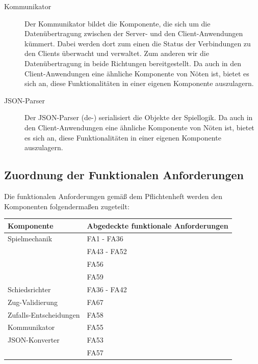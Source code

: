 \begin{description}
        \item[Kommunikator]
        Der Kommunikator bildet die Komponente, die sich um die Datenübertragung zwischen der Server- und den Client-Anwendungen kümmert. Dabei werden dort zum einen die Status der Verbindungen zu den Clients überwacht und verwaltet. Zum anderen wir die Datenübertragung in beide Richtungen bereitgestellt. Da auch in den Client-Anwendungen eine ähnliche Komponente von Nöten ist, bietet es sich an, diese Funktionalitäten in einer eigenen Komponente auszulagern.
        
        \item[JSON-Parser]
        Der JSON-Parser (de-) serialisiert die Objekte der Spiellogik. Da auch in den Client-Anwendungen eine ähnliche Komponente von Nöten ist, bietet es sich an, diese Funktionalitäten in einer eigenen Komponente auszulagern.  

    \end{description}
    
\subsection{Zuordnung der Funktionalen Anforderungen}

Die funktionalen Anforderungen gemäß dem Pflichtenheft werden den Komponenten folgendermaßen zugeteilt:

\begin{table}[h]
\centering
\begin{tabular}{|l|l|}
    \hline
    \textbf{Komponente} & \textbf{Abgedeckte funktionale Anforderungen}\\ \hline
    Spielmechanik & FA1 - FA36 \\
    & FA43 - FA52 \\
    & FA56 \\
    & FA59 \\ \hline
    
    Schiedsrichter & FA36 - FA42 \\ \hline
    
    Zug-Validierung & FA67 \\ \hline
    
    Zufalls-Entscheidungen & FA58 \\ \hline	
    
    Kommunikator & FA55 \\ \hline
    
    JSON-Konverter & FA53 \\
    & FA57\\ \hline


\end{tabular}
\end{table}
